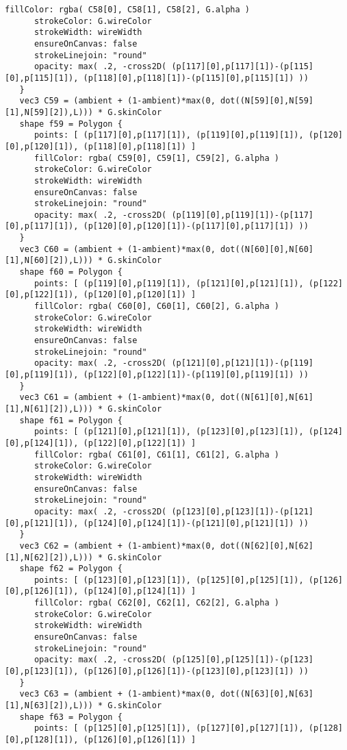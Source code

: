 \begin{lstlisting}[language=Sty-RT,escapechar=@]
      fillColor: rgba( C58[0], C58[1], C58[2], G.alpha )
      strokeColor: G.wireColor
      strokeWidth: wireWidth
      ensureOnCanvas: false
      strokeLinejoin: "round"
      opacity: max( .2, -cross2D( (p[117][0],p[117][1])-(p[115][0],p[115][1]), (p[118][0],p[118][1])-(p[115][0],p[115][1]) ))
   }
   vec3 C59 = (ambient + (1-ambient)*max(0, dot((N[59][0],N[59][1],N[59][2]),L))) * G.skinColor
   shape f59 = Polygon {
      points: [ (p[117][0],p[117][1]), (p[119][0],p[119][1]), (p[120][0],p[120][1]), (p[118][0],p[118][1]) ]
      fillColor: rgba( C59[0], C59[1], C59[2], G.alpha )
      strokeColor: G.wireColor
      strokeWidth: wireWidth
      ensureOnCanvas: false
      strokeLinejoin: "round"
      opacity: max( .2, -cross2D( (p[119][0],p[119][1])-(p[117][0],p[117][1]), (p[120][0],p[120][1])-(p[117][0],p[117][1]) ))
   }
   vec3 C60 = (ambient + (1-ambient)*max(0, dot((N[60][0],N[60][1],N[60][2]),L))) * G.skinColor
   shape f60 = Polygon {
      points: [ (p[119][0],p[119][1]), (p[121][0],p[121][1]), (p[122][0],p[122][1]), (p[120][0],p[120][1]) ]
      fillColor: rgba( C60[0], C60[1], C60[2], G.alpha )
      strokeColor: G.wireColor
      strokeWidth: wireWidth
      ensureOnCanvas: false
      strokeLinejoin: "round"
      opacity: max( .2, -cross2D( (p[121][0],p[121][1])-(p[119][0],p[119][1]), (p[122][0],p[122][1])-(p[119][0],p[119][1]) ))
   }
   vec3 C61 = (ambient + (1-ambient)*max(0, dot((N[61][0],N[61][1],N[61][2]),L))) * G.skinColor
   shape f61 = Polygon {
      points: [ (p[121][0],p[121][1]), (p[123][0],p[123][1]), (p[124][0],p[124][1]), (p[122][0],p[122][1]) ]
      fillColor: rgba( C61[0], C61[1], C61[2], G.alpha )
      strokeColor: G.wireColor
      strokeWidth: wireWidth
      ensureOnCanvas: false
      strokeLinejoin: "round"
      opacity: max( .2, -cross2D( (p[123][0],p[123][1])-(p[121][0],p[121][1]), (p[124][0],p[124][1])-(p[121][0],p[121][1]) ))
   }
   vec3 C62 = (ambient + (1-ambient)*max(0, dot((N[62][0],N[62][1],N[62][2]),L))) * G.skinColor
   shape f62 = Polygon {
      points: [ (p[123][0],p[123][1]), (p[125][0],p[125][1]), (p[126][0],p[126][1]), (p[124][0],p[124][1]) ]
      fillColor: rgba( C62[0], C62[1], C62[2], G.alpha )
      strokeColor: G.wireColor
      strokeWidth: wireWidth
      ensureOnCanvas: false
      strokeLinejoin: "round"
      opacity: max( .2, -cross2D( (p[125][0],p[125][1])-(p[123][0],p[123][1]), (p[126][0],p[126][1])-(p[123][0],p[123][1]) ))
   }
   vec3 C63 = (ambient + (1-ambient)*max(0, dot((N[63][0],N[63][1],N[63][2]),L))) * G.skinColor
   shape f63 = Polygon {
      points: [ (p[125][0],p[125][1]), (p[127][0],p[127][1]), (p[128][0],p[128][1]), (p[126][0],p[126][1]) ]

\end{lstlisting}
